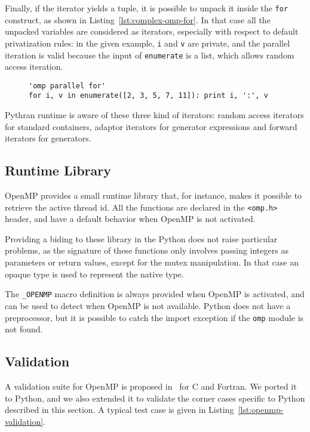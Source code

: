\documentclass{llncs}
\begin{document}
Finally, if the iterator yields a tuple, it is possible to unpack it inside the
\texttt{for} construct, as shown in Listing~\ref{lst:complex-omp-for}. In that case
all the unpacked variables are considered as iterators, especially with respect
to default privatization rules: in the given example, \texttt{i} and \texttt{v}
are private, and the parallel iteration is valid because the input of
\texttt{enumerate} is a list, which allows random access iteration.

\begin{figure}
    \begin{lstlisting}[label={lst:complex-omp-for}, caption={Parallel
    loop in Pythran with tuple unpacking.}]
'omp parallel for'
for i, v in enumerate([2, 3, 5, 7, 11]): print i, ':', v
  \end{lstlisting}
\end{figure}

Pythran runtime is aware of these three kind of iterators: random access
iterators for standard containers, adaptor iterators for generator expressions
and forward iterators for generators.

\subsection{Runtime Library}

OpenMP provides a small runtime library that, for instance, makes it possible to
retrieve the active thread id. All the functions are declared in the
\texttt{<omp.h>} header, and have a default behavior when OpenMP is not
activated.

Providing a biding to these library in the Python does not raise
particular problems, as the signature of these functions only involves passing
integers as parameters or return values, except for the mutex manipulation. In
that case an opaque type is used to represent the native type.

The \texttt{\_OPENMP} macro definition is always provided when OpenMP is
activated, and can be used to detect when OpenMP is not available. Python does
not have a preprocessor, but it is possible to catch the import exception if the
\texttt{omp} module is not found.

\subsection{Validation}

A validation suite for OpenMP is proposed in~\cite{wang2012} for C and Fortran.
We ported it to Python, and we also extended it to validate the corner cases
specific to Python described in this section. A typical test case is given in
Listing~\ref{lst:openmp-validation}.
\end{document}
